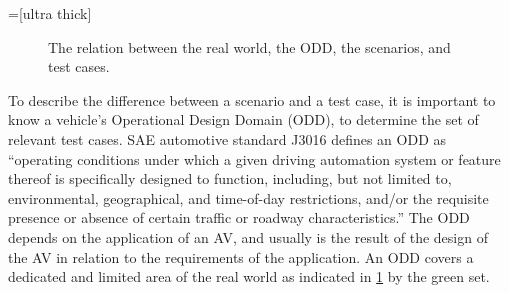 \setlength{\realworldwidth}{20em}
\setlength{\realworldheight}{12em}
=[ultra thick]
\begin{figure}
	\centering
	\caption{The relation between the real world, the ODD, the scenarios, and test cases.
	}
	\label{fig:test cases}
\end{figure}

To describe the difference between a scenario and a test case, it is important to know a vehicle's Operational Design Domain (ODD), to determine the set of relevant test cases. SAE automotive standard J3016 \autocite{sae2018j3016} defines an ODD as ``operating conditions under which a given driving automation system or feature thereof is specifically designed to function, including, but not limited to, environmental, geographical, and time-of-day restrictions, and/or the requisite presence or absence of certain traffic or roadway characteristics.'' The ODD depends on the application of an AV, and usually is the result of the design of the AV in relation to the requirements of the application. An ODD covers a dedicated and limited area of the real world as indicated in \cref{fig:test cases} by the green set.


